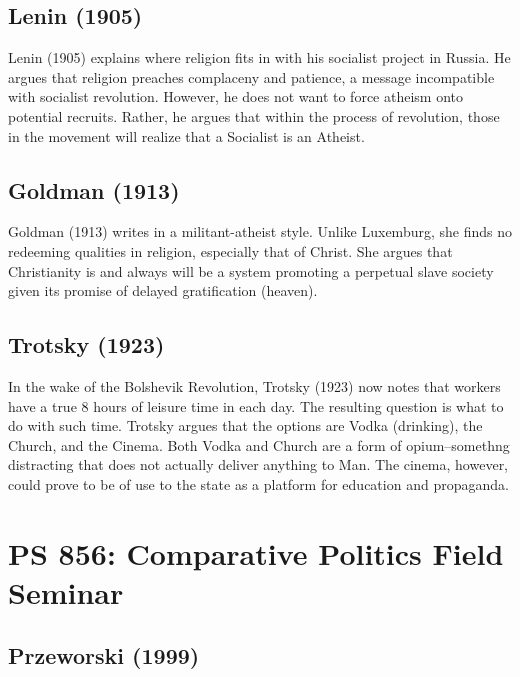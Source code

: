 \documentclass[
  english,
  man]{apa6}
\begin{document}
\hypertarget{leninsocialismreligion1905}{%
\subsection{Lenin (1905)}\label{leninsocialismreligion1905}}

Lenin (1905) explains where religion fits in with his socialist project in Russia. He argues that religion preaches complaceny and patience, a message incompatible with socialist revolution. However, he does not want to force atheism onto potential recruits. Rather, he argues that within the process of revolution, those in the movement will realize that a Socialist is an Atheist.

\hypertarget{goldmanfailurechristianity1913}{%
\subsection{Goldman (1913)}\label{goldmanfailurechristianity1913}}

Goldman (1913) writes in a militant-atheist style. Unlike Luxemburg, she finds no redeeming qualities in religion, especially that of Christ. She argues that Christianity is and always will be a system promoting a perpetual slave society given its promise of delayed gratification (heaven).

\hypertarget{trotskyvodkachurchcinema1923}{%
\subsection{Trotsky (1923)}\label{trotskyvodkachurchcinema1923}}

In the wake of the Bolshevik Revolution, Trotsky (1923) now notes that workers have a true 8 hours of leisure time in each day. The resulting question is what to do with such time. Trotsky argues that the options are Vodka (drinking), the Church, and the Cinema. Both Vodka and Church are a form of opium--somethng distracting that does not actually deliver anything to Man. The cinema, however, could prove to be of use to the state as a platform for education and propaganda.

\hypertarget{ps-856-comparative-politics-field-seminar}{%
\section{PS 856: Comparative Politics Field Seminar}\label{ps-856-comparative-politics-field-seminar}}

\hypertarget{przeworskidemocracy1999}{%
\subsection{Przeworski (1999)}\label{przeworskidemocracy1999}}
\end{document}
